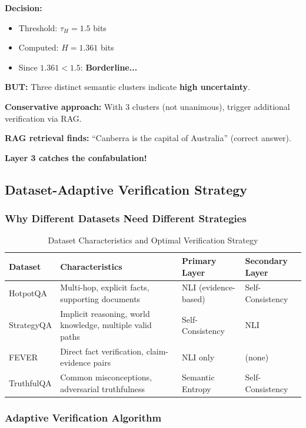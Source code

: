 \documentclass[12pt,a4paper]{article}
\theoremstyle{definition}
\begin{document}
\begin{examplebox}[title=Semantic Entropy Catches Confabulation]
\textbf{Decision:}
\begin{itemize}
    \item Threshold: $\tau_H = 1.5$ bits
    \item Computed: $H = 1.361$ bits
    \item Since $1.361 < 1.5$: \textbf{Borderline...}
\end{itemize}

\textbf{BUT:} Three distinct semantic clusters indicate \textbf{high uncertainty}.

\textbf{Conservative approach:} With 3 clusters (not unanimous), trigger additional verification via RAG.

\textbf{RAG retrieval finds:} ``Canberra is the capital of Australia'' (correct answer).

\textbf{Layer 3 catches the confabulation!}
\end{examplebox}

\subsection{Dataset-Adaptive Verification Strategy}

\subsubsection{Why Different Datasets Need Different Strategies}

\begin{table}[htbp]
\centering
\caption{Dataset Characteristics and Optimal Verification Strategy}
\small
\begin{tabular}{lp{3.5cm}p{3cm}p{3cm}}
\toprule
\textbf{Dataset} & \textbf{Characteristics} & \textbf{Primary Layer} & \textbf{Secondary Layer} \\
\midrule
HotpotQA & Multi-hop, explicit facts, supporting documents & NLI (evidence-based) & Self-Consistency \\
\midrule
StrategyQA & Implicit reasoning, world knowledge, multiple valid paths & Self-Consistency & NLI \\
\midrule
FEVER & Direct fact verification, claim-evidence pairs & NLI only & (none) \\
\midrule
TruthfulQA & Common misconceptions, adversarial truthfulness & Semantic Entropy & Self-Consistency \\
\bottomrule
\end{tabular}
\end{table}

\subsubsection{Adaptive Verification Algorithm}
\end{document}
